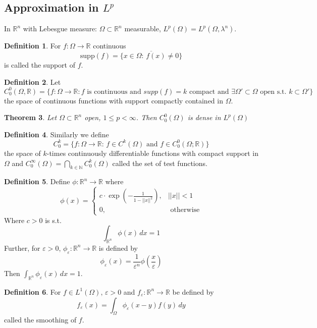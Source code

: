 \documentclass[a4paper, 12pt]{article}
\theoremstyle{plain}
\newtheorem{theorem}{Theorem}[subsection] %
\theoremstyle{definition}
\newtheorem{definition}[theorem]{Definition} %
\theoremstyle{lemma}
\theoremstyle{remark}
\theoremstyle{corollary}
\theoremstyle{example}
\begin{document}
	\subsection{Approximation in $L^p$}
	In $\mathbb{R}^n$ with Lebesgue measure: $\Omega \subset \mathbb{R}^n$ measurable, $L^p(\Omega) = L^p(\Omega, \lambda^n)$.
	\begin{definition}
		For $f:\Omega \to \mathbb{R}$ continuous \[\text{supp}(f) = \overline{\{x \in \Omega: \, f(x) \neq 0\}}\] is called the support of $f$.
	\end{definition}
	\begin{definition}
		Let $C^0_0(\Omega, \mathbb{R}) = \{f: \Omega \to \mathbb{R}: f \text{ is continuous and } supp(f) = k \text{ compact and } \exists \Omega' \subset \Omega \text{ open s.t. } k \subset \Omega'\}$ the space of continuous functions with support compactly contained in $\Omega$.
	\end{definition}
	\begin{theorem}
		Let $\Omega \subset \mathbb{R}^n$ open, $1\leq p < \infty$. Then $C^0_0(\Omega)$ is dense in $L^p(\Omega)$
	\end{theorem}
	\begin{definition}
		Similarly we define \[C_0^k = \{f: \Omega \to \mathbb{R}: \, f \in C^k(\Omega) \text{ and } f \in C_0^0(\Omega; \mathbb{R})\}\] the space of $k$-times continuously differentiable functions with compact support in $\Omega$ and $C_0^\infty(\Omega) = \bigcap_{k \in \mathbb{N}} C_0^k(\Omega)$ called the set of test functions.
	\end{definition}
	\begin{definition}
		Define $\phi: \mathbb{R}^n \to \mathbb{R}$ where \[\phi(x) = \begin{cases}
			c\cdot \exp(-\frac{1}{1-||x||^2}), & ||x||<1\\
			0, & \text{ otherwise}
		\end{cases}
		\]
		Where $c>0$ is s.t. \[\int_{\mathbb{R}^n} \phi(x)\,dx = 1\]
		Further, for $\varepsilon>0$, $\phi_\varepsilon:\mathbb{R}^n \to \mathbb{R}$ is defined by \[\phi_\varepsilon(x) = \frac{1}{\varepsilon^n} \phi\left(\frac{x}{\varepsilon}\right)\]
		Then $\int_{\mathbb{R}^n} \phi_\varepsilon(x)\,dx = 1$.
	\end{definition}
	\begin{definition}
		For $f\in L^1(\Omega), \, \varepsilon>0$ and $f_\varepsilon: \mathbb{R}^n \to \mathbb{R}$ be defined by \[f_\varepsilon(x) = \int_{\Omega} \phi_\varepsilon(x-y)f(y)\,dy\] called the smoothing of $f$.
	\end{definition}
\end{document}
